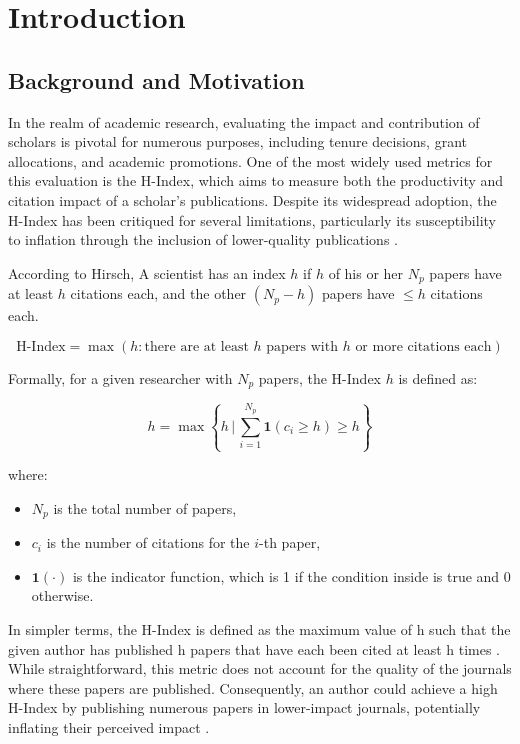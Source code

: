 \chapter{Introduction}
\label{ch:intro}

\section{Background and Motivation}
In the realm of academic research, evaluating the impact and contribution of scholars is pivotal for numerous purposes,
 including tenure decisions, grant allocations, and academic promotions. 
 One of the most widely used metrics for this evaluation is the H-Index, which aims to measure both the productivity 
 and citation impact of a scholar’s publications. Despite its widespread adoption, the H-Index has been critiqued for several limitations,
  particularly its susceptibility to inflation through the inclusion of lower-quality publications \cite{costas2007h, tonta2020monetary}.

According to Hirsch,
A scientist has an index \( h \) if \( h \) of his or her \( N_p \) papers have at least \( h \) citations each, and the other \( (N_p - h) \) papers have \(\leq h \) citations each.

\[
\text{H-Index} = \max \left( h : \text{there are at least } h \text{ papers with } h \text{ or more citations each} \right)
\]

Formally, for a given researcher with \( N_p \) papers, the H-Index \( h \) is defined as:

\[
h = \max \left\{ h \, \Bigg| \, \sum_{i=1}^{N_p} \mathbf{1} (c_i \geq h) \geq h \right\}
\]

where:
\begin{itemize}
    \item \( N_p \) is the total number of papers,
    \item \( c_i \) is the number of citations for the \( i \)-th paper,
    \item \( \mathbf{1}(\cdot) \) is the indicator function, which is 1 if the condition inside is true and 0 otherwise.
\end{itemize} In simpler terms, the H-Index is defined as the maximum value of h 
such that the given author has published h papers that have each been cited at least h times \cite{hirsch2005index}.
While straightforward, this metric does not account for the quality of the journals where 
these papers are published. Consequently, an author could achieve a high H-Index
 by publishing numerous papers in lower-impact journals, potentially inflating their perceived impact \cite{tonta2020monetary}.

